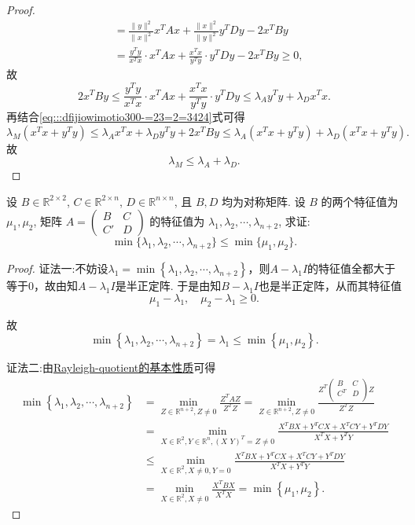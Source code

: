 \documentclass[../../main.tex]{subfiles}%
\begin{document}
\begin{proof}
\begin{align*}
&= \frac{\| y \|^2}{\| x \|^2}x^T A x + \frac{\| x \|^2}{\| y \|^2}y^T D y - 2x^T B y \\
&= \frac{y^T y}{x^T x} \cdot x^T A x + \frac{x^T x}{y^T y} \cdot y^T D y - 2x^T B y \geqslant 0,
\end{align*}
故
$$2x^T B y \leqslant \frac{y^T y}{x^T x} \cdot x^T A x + \frac{x^T x}{y^T y} \cdot y^T D y \leqslant \lambda_A y^T y + \lambda_D x^T x.$$
再结合\eqref{eq:::dfijiowimotio300-=23=2=3424}式可得
$$\lambda_M (x^T x + y^T y) \leqslant \lambda_A x^T x + \lambda_D y^T y + 2x^T B y \leqslant \lambda_A (x^T x + y^T y) + \lambda_D (x^T x + y^T y).$$
故
$$\lambda_M \leqslant \lambda_A + \lambda_D.$$

\end{proof}

\begin{example}
设 $B \in \mathbb{R}^{2 \times 2}$, $C \in \mathbb{R}^{2 \times n}$, $D \in \mathbb{R}^{n \times n}$, 且 $B,D$ 均为对称矩阵. 设 $B$ 的两个特征值为 $\mu_1,\mu_2$, 矩阵 $A = \begin{pmatrix} B & C \\ C' & D \end{pmatrix}$ 的特征值为 $\lambda_1,\lambda_2,\cdots,\lambda_{n+2}$, 求证:
$$\min\{\lambda_1,\lambda_2,\cdots,\lambda_{n+2}\} \leqslant \min\{\mu_1,\mu_2\}.$$
\end{example}
\begin{proof}

{\color{blue}证法一:}不妨设$\lambda_1=\min\left\{ \lambda_1,\lambda_2,\cdots,\lambda_{n+2} \right\}$，则$A-\lambda_1 I$的特征值全都大于等于$0$，故由知$A-\lambda_1 I$是半正定阵.
于是由知$B-\lambda_1 I$也是半正定阵，从而其特征值
$$\mu_1-\lambda_1, \quad \mu_2-\lambda_1 \geqslant 0.$$

故
$$\min\left\{ \lambda_1,\lambda_2,\cdots,\lambda_{n+2} \right\}=\lambda_1 \leqslant \min\left\{ \mu_1,\mu_2 \right\}.$$

{\color{blue}证法二:}由\hyperref[proposition:Rayleigh-quotient瑞丽商的基本性质]{Rayleigh-quotient的基本性质}可得
\begin{align*}
\min \left\{ \lambda _1,\lambda _2,\cdots ,\lambda _{n+2} \right\} &=\underset{Z\in \mathbb{R} ^{n+2},Z\ne 0}{\min}\frac{Z^TAZ}{Z^TZ}=\underset{Z\in \mathbb{R} ^{n+2},Z\ne 0}{\min}\frac{Z^T\left( \begin{matrix}
B&		C\\
C^T&		D\\
\end{matrix} \right) Z}{Z^TZ}
\\
&=\underset{X\in \mathbb{R} ^2,Y\in \mathbb{R} ^n,\left( X\,\,Y \right) ^T=Z\ne 0}{\min}\frac{X^TBX+Y^TCX+X^TCY+Y^TDY}{X^TX+Y^TY}
\\
&\leqslant \underset{X\in \mathbb{R} ^2,X\ne 0,Y=0}{\min}\frac{X^TBX+Y^TCX+X^TCY+Y^TDY}{X^TX+Y^TY}
\\
&=\underset{X\in \mathbb{R} ^2,X\ne 0}{\min}\frac{X^TBX}{X^TX}=\min \left\{ \mu _1,\mu _2 \right\} .
\end{align*}

\end{proof}
\end{document}
